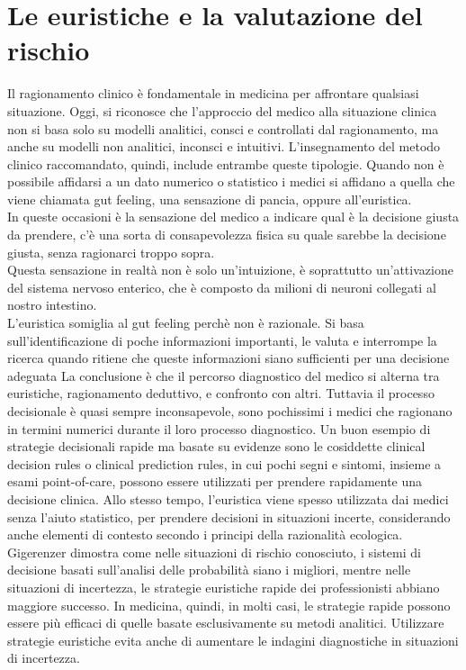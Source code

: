 \section{Le euristiche e la valutazione del rischio}

Il ragionamento clinico è fondamentale in medicina per affrontare qualsiasi situazione. Oggi, si riconosce che l'approccio del medico alla situazione clinica non si basa solo su modelli analitici, consci e controllati dal ragionamento, ma anche su modelli non analitici, inconsci e intuitivi. L'insegnamento del metodo clinico raccomandato, quindi, include entrambe queste tipologie. Quando non è possibile affidarsi a un dato numerico o statistico i medici si affidano a quella che viene chiamata gut feeling, una sensazione di pancia, oppure all'euristica. \\
In queste occasioni è la sensazione del medico a indicare qual è la decisione giusta da prendere, c'è una sorta di consapevolezza fisica su quale sarebbe la decisione giusta, senza ragionarci troppo sopra. \\
Questa sensazione in realtà non è solo un'intuizione, è soprattutto un'attivazione del sistema nervoso enterico, che è composto da milioni di neuroni collegati al nostro intestino. \\
L'euristica somiglia al gut feeling perchè non è razionale. Si basa sull'identificazione di poche informazioni importanti, le valuta e interrompe la ricerca quando ritiene che queste informazioni siano sufficienti per una decisione adeguata 
La conclusione è che il percorso diagnostico del medico si alterna tra euristiche, ragionamento deduttivo, e confronto con altri. Tuttavia il processo decisionale è quasi sempre inconsapevole, sono pochissimi i medici che ragionano in termini numerici durante il loro processo diagnostico.
Un buon esempio di strategie decisionali rapide ma basate su evidenze sono le cosiddette clinical decision rules o clinical prediction rules, in cui pochi segni e sintomi, insieme a esami point-of-care, possono essere utilizzati per prendere rapidamente una decisione clinica. Allo stesso tempo, l'euristica viene spesso utilizzata dai medici senza l'aiuto statistico, per prendere decisioni in situazioni incerte, considerando anche elementi di contesto secondo i principi della razionalità ecologica.\\

Gigerenzer dimostra come nelle situazioni di rischio conosciuto, i sistemi di decisione basati sull'analisi delle probabilità siano i migliori, mentre nelle situazioni di incertezza, le strategie euristiche rapide dei professionisti abbiano maggiore successo. In medicina, quindi, in molti casi, le strategie rapide possono essere più efficaci di quelle basate esclusivamente su metodi analitici. Utilizzare strategie euristiche evita anche di aumentare le indagini diagnostiche in situazioni di incertezza.\\

